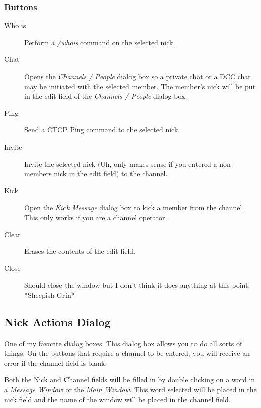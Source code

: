\documentclass[titlepage]{article}
\begin{document}
\subsubsection{Buttons}
\begin{description}
\item[Who is] Perform a \textit{/whois} command on the selected nick.
\item[Chat] Opens the \textit{Channels / People} dialog box so a private
chat or a DCC chat may be initiated with the selected member. The
member's nick will be put in the edit field of the \textit{Channels / People}
dialog box.
\item[Ping] Send a CTCP Ping command to the selected nick.
\item[Invite] Invite the selected nick (Uh, only makes sense if you
entered a non-members nick in the edit field) to the channel.
\item[Kick] Open the \textit{Kick Message} dialog box to kick a member
from the channel. This only works if you are a channel operator.
\item[Clear] Erases the contents of the edit field.
\item[Close] Should close the window but I don't think it does anything at
this point. *Sheepish Grin*
\end{description}

\subsection{Nick Actions Dialog}\label{Nick Action}
One of my favorite dialog boxes. This dialog box allows you to do all
sorts of things. On the buttons that require a channel to be entered,
you will receive an error if the channel field is blank.

Both the Nick and Channel fields will be filled in by double clicking
on a word in a \textit{Message Window} or the \textit{Main Window}.
This word selected will be placed in the nick field and the name of
the window will be placed in the channel field.
\end{document}
